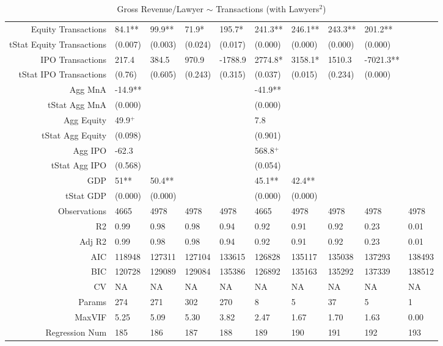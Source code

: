 \begin{table}[ht]
\begin{tabular}{rlllllllll}
  Equity Transactions & 84.1** & 99.9** & 71.9* & 195.7* & 241.3** & 246.1** & 243.3** & 201.2** &  \\ 
  tStat Equity Transactions & (0.007) & (0.003) & (0.024) & (0.017) & (0.000) & (0.000) & (0.000) & (0.000) &  \\ 
  IPO Transactions & 217.4 & 384.5 & 970.9 & -1788.9 & 2774.8* & 3158.1* & 1510.3 & -7021.3** &  \\ 
  tStat IPO Transactions & (0.76) & (0.605) & (0.243) & (0.315) & (0.037) & (0.015) & (0.234) & (0.000) &  \\ 
  Agg MnA & -14.9** &  &  &  & -41.9** &  &  &  &  \\ 
  tStat Agg MnA & (0.000) &  &  &  & (0.000) &  &  &  &  \\ 
  Agg Equity & 49.9$^{+}$ &  &  &  & 7.8 &  &  &  &  \\ 
  tStat Agg Equity & (0.098) &  &  &  & (0.901) &  &  &  &  \\ 
  Agg IPO & -62.3 &  &  &  & 568.8$^{+}$ &  &  &  &  \\ 
  tStat Agg IPO & (0.568) &  &  &  & (0.054) &  &  &  &  \\ 
  GDP & 51** & 50.4** &  &  & 45.1** & 42.4** &  &  &  \\ 
  tStat GDP & (0.000) & (0.000) &  &  & (0.000) & (0.000) &  &  &  \\ 
  Observations & 4665 & 4978 & 4978 & 4978 & 4665 & 4978 & 4978 & 4978 & 4978 \\ 
  R2 & 0.99 & 0.98 & 0.98 & 0.94 & 0.92 & 0.91 & 0.92 & 0.23 & 0.01 \\ 
  Adj R2 & 0.99 & 0.98 & 0.98 & 0.94 & 0.92 & 0.91 & 0.92 & 0.23 & 0.01 \\ 
  AIC & 118948 & 127311 & 127104 & 133615 & 126828 & 135117 & 135038 & 137293 & 138493 \\ 
  BIC & 120728 & 129089 & 129084 & 135386 & 126892 & 135163 & 135292 & 137339 & 138512 \\ 
  CV & NA & NA & NA & NA & NA & NA & NA & NA & NA \\ 
  Params & 274 & 271 & 302 & 270 & 8 & 5 & 37 & 5 & 1 \\ 
  MaxVIF & 5.25 & 5.09 & 5.30 & 3.82 & 2.47 & 1.67 & 1.70 & 1.63 & 0.00 \\ 
  Regression Num & 185 & 186 & 187 & 188 & 189 & 190 & 191 & 192 & 193 \\ 
   \hline
\end{tabular}
\caption{Gross Revenue/Lawyer $\sim$ Transactions (with Lawyers$^2$)} 
\end{table}
